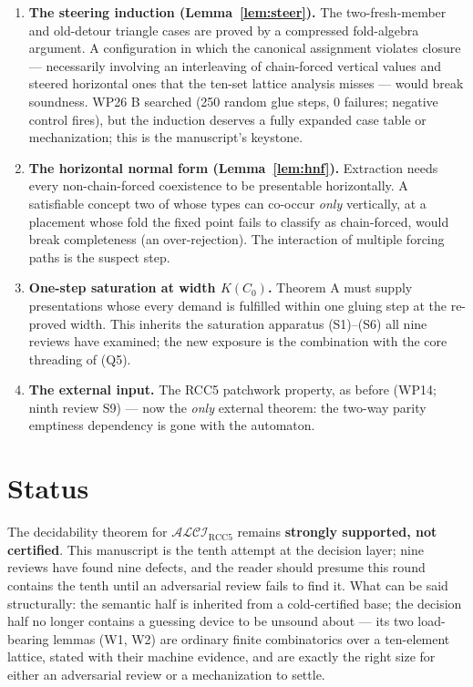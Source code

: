 \documentclass[11pt]{article}
\theoremstyle{definition}
\newcommand{\ALCIRCC}{\mathcal{ALCI}_{\mathrm{RCC5}}}
\begin{document}
\begin{enumerate}[label=(W\arabic*),leftmargin=2.6em]
\item \textbf{The steering induction (Lemma~\ref{lem:steer}).}  The
two-fresh-member and old-detour triangle cases are proved by a
compressed fold-algebra argument.  A configuration in which the
canonical assignment violates closure --- necessarily involving an
interleaving of chain-forced vertical values and steered horizontal
ones that the ten-set lattice analysis misses --- would break
soundness.  WP26 B searched (250 random glue steps, 0 failures;
negative control fires), but the induction deserves a fully expanded
case table or mechanization; this is the manuscript's keystone.
\item \textbf{The horizontal normal form (Lemma~\ref{lem:hnf}).}
Extraction needs every non-chain-forced coexistence to be presentable
horizontally.  A satisfiable concept two of whose types can co-occur
\emph{only} vertically, at a placement whose fold the fixed point
fails to classify as chain-forced, would break completeness (an
over-rejection).  The interaction of multiple forcing paths is the
suspect step.
\item \textbf{One-step saturation at width $K(C_0)$.}  Theorem A must
supply presentations whose every demand is fulfilled within one gluing
step at the re-proved width.  This inherits the saturation apparatus
(S1)--(S6) all nine reviews have examined; the new exposure is the
combination with the core threading of (Q5).
\item \textbf{The external input.}  The RCC5 patchwork property, as
before (WP14; ninth review S9) --- now the \emph{only} external
theorem: the two-way parity emptiness dependency is gone with the
automaton.
\end{enumerate}

\section{Status}

The decidability theorem for $\ALCIRCC$ remains \textbf{strongly
supported, not certified}.  This manuscript is the tenth attempt at the
decision layer; nine reviews have found nine defects, and the reader
should presume this round contains the tenth until an adversarial
review fails to find it.  What can be said structurally: the semantic
half is inherited from a cold-certified base; the decision half no
longer contains a guessing device to be unsound about --- its two
load-bearing lemmas (W1, W2) are ordinary finite combinatorics over a
ten-element lattice, stated with their machine evidence, and are
exactly the right size for either an adversarial review or a
mechanization to settle.
\end{document}
